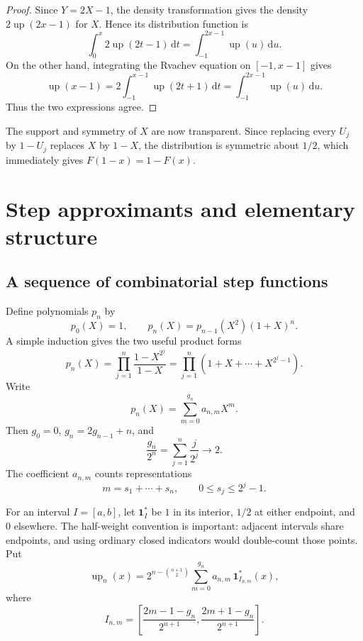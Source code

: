 \documentclass[11pt]{article}
\numberwithin{equation}{section}
\theoremstyle{definition}
\theoremstyle{remark}
\newcommand{\dd}{\,\mathrm{d}}
\newcommand{\upf}{\operatorname{up}}
\begin{document}
\begin{proof}
Since $Y=2X-1$, the density transformation gives the density
$2\upf(2x-1)$ for $X$.  Hence its distribution function is
\[
 \int_0^x2\upf(2t-1)\dd t=\int_{-1}^{2x-1}\upf(u)\dd u.
\]
On the other hand, integrating the Rvachev equation on $[-1,x-1]$ gives
\[
 \upf(x-1)=2\int_{-1}^{x-1}\upf(2t+1)\dd t
          =\int_{-1}^{2x-1}\upf(u)\dd u.
\]
Thus the two expressions agree.
\end{proof}

The support and symmetry of $X$ are now transparent.  Since replacing every
$U_j$ by $1-U_j$ replaces $X$ by $1-X$, the distribution is symmetric about
$1/2$, which immediately gives $F(1-x)=1-F(x)$.

\section{Step approximants and elementary structure}\label{sec:basic-properties}

\subsection{A sequence of combinatorial step functions}

Define polynomials $p_n$ by
\begin{equation}\label{eq:p-recurrence}
 p_0(X)=1,\qquad p_n(X)=p_{n-1}(X^2)(1+X)^n.
\end{equation}
A simple induction gives the two useful product forms
\begin{equation}\label{eq:p-products}
 p_n(X)=\prod_{j=1}^{n}\frac{1-X^{2^j}}{1-X}
       =\prod_{j=1}^{n}(1+X+\cdots+X^{2^j-1}).
\end{equation}
Write
\[
 p_n(X)=\sum_{m=0}^{g_n}a_{n,m}X^m.
\]
Then $g_0=0$, $g_n=2g_{n-1}+n$, and
\begin{equation}\label{eq:degree-limit}
 \frac{g_n}{2^n}=\sum_{j=1}^{n}\frac{j}{2^j}\longrightarrow2.
\end{equation}
The coefficient $a_{n,m}$ counts representations
\[
 m=s_1+\cdots+s_n,
 \qquad 0\le s_j\le2^j-1.
\]

For an interval $I=[a,b]$, let $\mathbf1_I^*$ be $1$ in its interior,
$1/2$ at either endpoint, and $0$ elsewhere.  The half-weight convention is
important: adjacent intervals share endpoints, and using ordinary closed
indicators would double-count those points.  Put
\begin{equation}\label{eq:step-approx}
 \upf_n(x)=2^{n-\binom{n+1}{2}}
 \sum_{m=0}^{g_n}a_{n,m}\,
 \mathbf1^*_{I_{n,m}}(x),
\end{equation}
where
\begin{equation}\label{eq:step-interval}
 I_{n,m}=\left[
 \frac{2m-1-g_n}{2^{n+1}},
 \frac{2m+1-g_n}{2^{n+1}}
 \right].
\end{equation}
\end{document}
